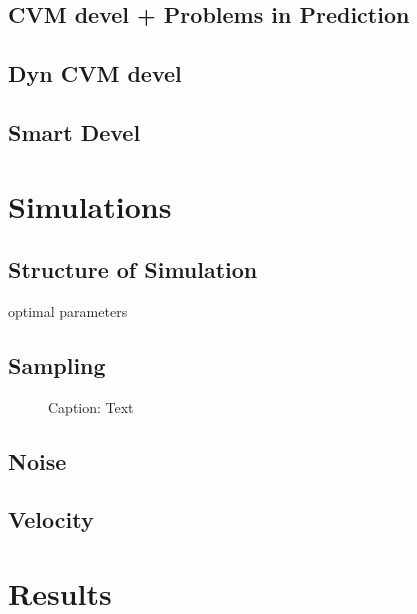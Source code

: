 \documentclass[notitlepage, a4paper, 11pt]{scrartcl}
\begin{document}
\begin{multicols}{2}
\subsection{CVM devel + Problems in Prediction}
\subsection{Dyn CVM devel}
\subsection{Smart Devel}

\section{Simulations}

\subsection{Structure of Simulation}
optimal parameters

\subsection{Sampling}

\begin{figure}[H]
    \centering
    \caption{Caption: Text}
    \label{fig:placeholder}
\end{figure}

\subsection{Noise}
\subsection{Velocity}

\section{Results}


\end{multicols}
\end{document}
